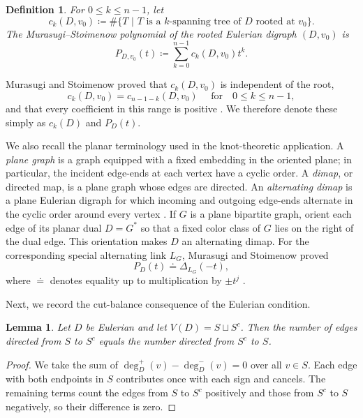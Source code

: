\documentclass[12pt]{amsart}
\newtheorem{definition}[theorem]{Definition}
\newtheorem{lemma}[theorem]{Lemma}
\numberwithin{equation}{section}
\numberwithin{theorem}{section}
\begin{document}
\begin{definition}
  \label{def-Murasugi--Stoimenow}
  For $0\leq k\leq n-1$, let
  \begin{equation*}
    c_k(D,v_0)\coloneqq
    \#\{T \,\,|\,\, T\text{ is a $k$-spanning tree of $D$ rooted at $v_0$}\}.
  \end{equation*}
  The \emph{Murasugi--Stoimenow polynomial} of the rooted Eulerian digraph $(D,v_0)$ is
  \begin{equation}
    \label{eq-Murasugi--Stoimenow}
    P_{D,v_0}(t)\coloneqq \sum_{k=0}^{n-1}c_k(D,v_0)t^k.
  \end{equation}
\end{definition}

Murasugi and Stoimenow proved that $c_k(D,v_0)$ is independent of the root,
\begin{equation}
  \label{eq-ms-palindromicity}
  c_k(D,v_0)=c_{n-1-k}(D,v_0)\quad\text{  for}\quad 0\leq k\leq n-1,
\end{equation}
and that every coefficient in this range is positive \cite[Proposition~1(1)-(4)]{MS03}. We therefore denote these simply as $c_k(D)$ and $P_D(t)$. 

We also recall the planar terminology used in the knot-theoretic application. A \emph{plane graph} is a graph equipped with a fixed embedding in the oriented plane; in particular, the incident edge-ends at each vertex have a cyclic order. A \emph{dimap}, or directed map, is a plane graph whose edges are directed. An \emph{alternating dimap} is a plane Eulerian digraph for which incoming and outgoing edge-ends alternate in the cyclic order around every vertex \cite[Section~2.3]{KMP}. If $G$ is a plane bipartite graph, orient each edge of its planar dual $D=G^*$ so that a fixed color class of $G$ lies on the right of the dual edge. This orientation makes $D$ an alternating dimap. For the corresponding special alternating link $L_G$, Murasugi and Stoimenow proved
\begin{equation*}
  P_D(t)\doteq \Delta_{L_G}(-t),
\end{equation*}
where $\doteq$ denotes equality up to multiplication by $\pm t^j$ \cite[Theorem~2]{MS03}.

Next, we record the cut-balance consequence of the Eulerian condition.

\begin{lemma}
  \label{lemma-eulerian-cut-balance}
  Let $D$ be Eulerian and let $V(D)=S\sqcup S^c$. Then the number of edges directed from $S$ to $S^c$ equals the number directed from $S^c$ to $S$.
\end{lemma}
\begin{proof}
  We take the sum of $\deg_D^+(v)-\deg_D^-(v)=0$ over all $v\in S$. Each edge with both endpoints in $S$ contributes once with each sign and cancels. The remaining terms count the edges from $S$ to $S^c$ positively and those from $S^c$ to $S$ negatively, so their difference is zero.
\end{proof}
\end{document}
